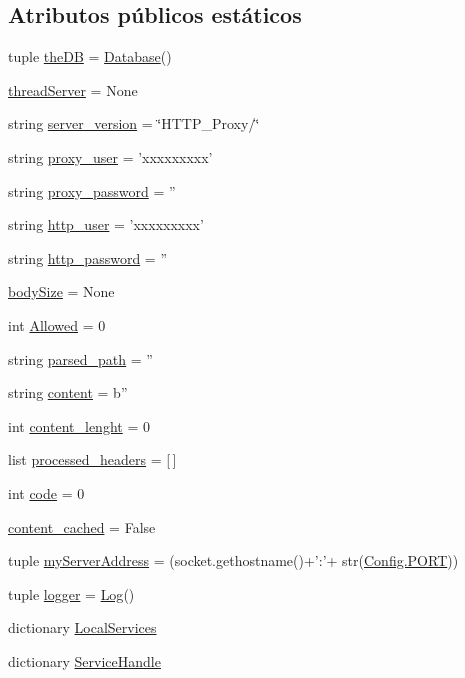 \subsection*{Atributos públicos estáticos}
\begin{DoxyCompactItemize}
\item 
tuple \hyperlink{class_proxy_1_1_proxy_a19dcf84349392c1c43473fe836593307}{the\-D\-B} = \hyperlink{classdb__layer_1_1_database}{Database}()
\item 
\hyperlink{class_proxy_1_1_proxy_abeccfa250f08858f279dfba710a600c4}{thread\-Server} = None
\item 
string \hyperlink{class_proxy_1_1_proxy_a5b2e47ca8b9c1f1f1bb66947420ae45f}{server\-\_\-version} = \char`\"{}H\-T\-T\-P\-\_\-\-Proxy/\char`\"{}
\item 
string \hyperlink{class_proxy_1_1_proxy_a21e5768434deac18cef85f8a8a9870ac}{proxy\-\_\-user} = 'xxxxxxxxx'
\item 
string \hyperlink{class_proxy_1_1_proxy_ac53a135a1f0cd666c4a4136e433bbaab}{proxy\-\_\-password} = ''
\item 
string \hyperlink{class_proxy_1_1_proxy_aafb9a0c764e3e3439045f830cbb7276d}{http\-\_\-user} = 'xxxxxxxxx'
\item 
string \hyperlink{class_proxy_1_1_proxy_ac1cb73a7484ca9effbfe1f5075906894}{http\-\_\-password} = ''
\item 
\hyperlink{class_proxy_1_1_proxy_a69cca6a8dc492a7df46430f19598a27b}{body\-Size} = None
\item 
int \hyperlink{class_proxy_1_1_proxy_ac74831cde9a7ad2ebb39d6ef92d5aaf6}{Allowed} = 0
\item 
string \hyperlink{class_proxy_1_1_proxy_a7e88511cbc9940770aa5b62a2d05f0ff}{parsed\-\_\-path} = ''
\item 
string \hyperlink{class_proxy_1_1_proxy_a6415f8b9913c11a773f03f25618db57c}{content} = b''
\item 
int \hyperlink{class_proxy_1_1_proxy_a6db9fd736b73c14f6cf809c17abf6180}{content\-\_\-lenght} = 0
\item 
list \hyperlink{class_proxy_1_1_proxy_a83e27fbf0f02ac854aa73b8adf95b1e1}{processed\-\_\-headers} = \mbox{[}$\,$\mbox{]}
\item 
int \hyperlink{class_proxy_1_1_proxy_a570ab3ad0617dac2e5f6837f17da9385}{code} = 0
\item 
\hyperlink{class_proxy_1_1_proxy_ae24029c912f5ea05cad1ee6635954971}{content\-\_\-cached} = False
\item 
tuple \hyperlink{class_proxy_1_1_proxy_a062b5fa9885896b6c1e05542794d28d8}{my\-Server\-Address} = (socket.\-gethostname()+'\-:'+ str(\hyperlink{class_config_1_1_config_aef20c383d5c356bfc5771e132ad241df}{Config.\-P\-O\-R\-T}))
\item 
tuple \hyperlink{class_proxy_1_1_proxy_a1d1c37c018e4b8145ef91a90784e2652}{logger} = \hyperlink{class_log_1_1_log}{Log}()
\item 
dictionary \hyperlink{class_proxy_1_1_proxy_ab8904909599e432eceb2e73c44dca4ef}{Local\-Services}
\item 
dictionary \hyperlink{class_proxy_1_1_proxy_a3d8cb3aac8f5187e97d2b09e71d1d834}{Service\-Handle}
\end{DoxyCompactItemize}


